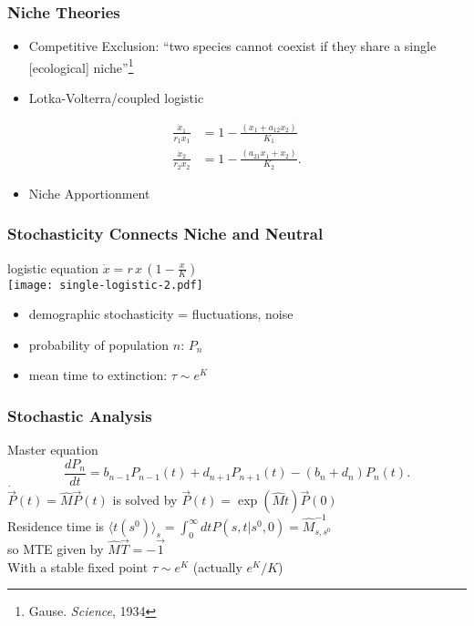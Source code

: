 \documentclass[dvipsnames]{beamer}
\begin{document}
\begin{frame}
\frametitle{Niche Theories}
\begin{itemize}
\item Competitive Exclusion: ``two species cannot coexist if they share a single [ecological] niche''\footnote{Gause. \emph{Science}, 1934}
\pause
\item Lotka-Volterra/coupled logistic
\end{itemize}
\begin{align*}
\frac{\dot{x}_1}{r_1 x_1} &= 1 - \frac{(x_1 + a_{12}x_2)}{K_1} \\
\frac{\dot{x}_2}{r_2 x_2} &= 1 - \frac{(a_{21}x_1 + x_2)}{K_2}. 
\end{align*}
\pause
\begin{itemize}
\item Niche Apportionment
\end{itemize}
\end{frame}


\begin{frame}
\frametitle{Stochasticity Connects Niche and Neutral}
\centering
logistic equation $\dot{x} = r \, x \, \left(1-\frac{x}{K}\right)$ \\
\texttt{[image: single-logistic-2.pdf]}
\begin{itemize}
	\item demographic stochasticity = fluctuations, noise
	\pause
	\item probability of population $n$: $P_n$
	\item mean time to extinction: $\tau \sim e^K$ %
\end{itemize}
\end{frame}


\begin{frame}
\frametitle{Stochastic Analysis}
Master equation
\begin{equation*}
\frac{dP_n}{dt} =  b_{n-1}P_{n-1}(t) + d_{n+1}P_{n+1}(t) - (b_n+d_n)P_n(t).
\end{equation*}
\pause
$\dot{\vec{P}}(t) = \hat{M}\vec{P}(t)$ is solved by $\vec{P}(t)=\exp\left(\hat{M}t\right)\vec{P}(0)$ \\
\pause
Residence time is $\langle t(s^0)\rangle_s = \int_0^{\infty} dt P(s,t|s^0,0)=\hat{M}^{-1}_{s,s^0}$ \\
so MTE given by $\hat{M}\vec{T}=-\vec{1}$ \\
\pause
With a stable fixed point $\tau \sim e^K$ (actually $e^K/K$)
\end{frame}
\end{document}
